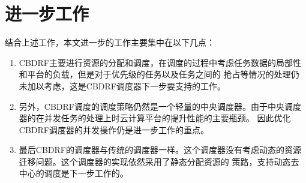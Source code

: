 \section{进一步工作}
结合上述工作，本文进一步的工作主要集中在以下几点：
\begin{enumerate}
\item CBDRF主要进行资源的分配和调度，在调度的过程中考虑任务数据的局部性和平台的负载，但是对于优先级的任务以及任务之间的
抢占等情况的处理仍未加以考虑，这是CBDRF调度器下一步要支持的工作。
\item 另外，CBDRF调度的调度策略仍然是一个轻量的中央调度器。由于中央调度器的在并发任务的处理上时云计算平台的提升性能的主要瓶颈。
因此优化CBDRF调度器的并发操作仍是进一步工作的重点。
\item 最后CBDRF的调度器与传统的调度器一样。这个调度器没有考虑动态的资源迁移问题。这个调度器的实现依然采用了静态分配资源的
策路，支持动态去中心的调度是下一步工作的。
\end{enumerate}

